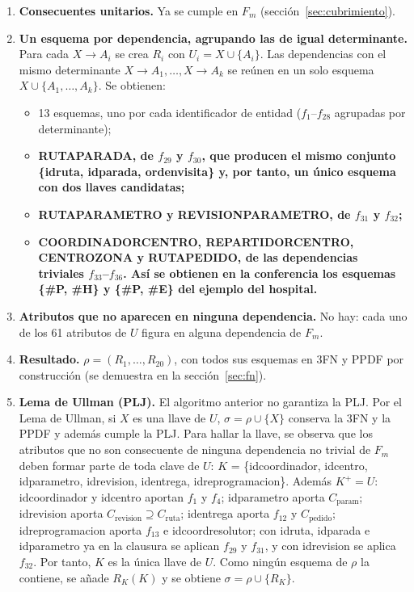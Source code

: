 \documentclass[11pt,a4paper]{article}
\newcommand{\ubrk}{\textunderscore\allowbreak}
\newcommand{\campo}[1]{\textnormal{\ttfamily\let\_\ubrk #1}}
\newcommand{\tabla}[1]{\begingroup\sffamily\bfseries\let\_\ubrk #1\endgroup}
\begin{document}
\begin{enumerate}
\item \textbf{Consecuentes unitarios.} Ya se cumple en $F_m$ (sección~\ref{sec:cubrimiento}).
\item \textbf{Un esquema por dependencia, agrupando las de igual determinante.} Para cada $X \rightarrow A_i$ se crea $R_i$ con $U_i = X \cup \{A_i\}$. Las dependencias con el mismo determinante $X \rightarrow A_1, \dots, X \rightarrow A_k$ se reúnen en un solo esquema $X \cup \{A_1, \dots, A_k\}$. Se obtienen:
  \begin{itemize}
  \item 13 esquemas, uno por cada identificador de entidad ($f_1$--$f_{28}$ agrupadas por determinante);
  \item \tabla{RUTA\_PARADA}, de $f_{29}$ y $f_{30}$, que producen el mismo conjunto \{\campo{id\_ruta}, \campo{id\_parada}, \campo{orden\_visita}\} y, por tanto, un único esquema con dos llaves candidatas;
  \item \tabla{RUTA\_PARAMETRO} y \tabla{REVISION\_PARAMETRO}, de $f_{31}$ y $f_{32}$;
  \item \tabla{COORDINADOR\_CENTRO}, \tabla{REPARTIDOR\_CENTRO}, \tabla{CENTRO\_ZONA} y \tabla{RUTA\_PEDIDO}, de las dependencias triviales $f_{33}$--$f_{36}$. Así se obtienen en la conferencia los esquemas \{\#P, \#H\} y \{\#P, \#E\} del ejemplo del hospital.
  \end{itemize}
\item \textbf{Atributos que no aparecen en ninguna dependencia.} No hay: cada uno de los 61 atributos de $U$ figura en alguna dependencia de $F_m$.
\item \textbf{Resultado.} $\rho = (R_1, \dots, R_{20})$, con todos sus esquemas en 3FN y PPDF por construcción (se demuestra en la sección~\ref{sec:fn}).
\item \textbf{Lema de Ullman (PLJ).} El algoritmo anterior no garantiza la PLJ. Por el Lema de Ullman, si $X$ es una llave de $U$, $\sigma = \rho \cup \{X\}$ conserva la 3FN y la PPDF y además cumple la PLJ. Para hallar la llave, se observa que los atributos que no son consecuente de ninguna dependencia no trivial de $F_m$ deben formar parte de toda clave de $U$: $K$ = \{\campo{id\_coordinador}, \campo{id\_centro}, \campo{id\_parametro}, \campo{id\_revision}, \campo{id\_entrega}, \campo{id\_reprogramacion}\}. Además $K^+ = U$: \campo{id\_coordinador} y \campo{id\_centro} aportan $f_1$ y $f_4$; \campo{id\_parametro} aporta $C_{\text{param}}$; \campo{id\_revision} aporta $C_{\text{revision}} \supseteq C_{\text{ruta}}$; \campo{id\_entrega} aporta $f_{12}$ y $C_{\text{pedido}}$; \campo{id\_reprogramacion} aporta $f_{13}$ e \campo{id\_coord\_resolutor}; con \campo{id\_ruta}, \campo{id\_parada} e \campo{id\_parametro} ya en la clausura se aplican $f_{29}$ y $f_{31}$, y con \campo{id\_revision} se aplica $f_{32}$. Por tanto, $K$ es la única llave de $U$. Como ningún esquema de $\rho$ la contiene, se añade $R_K(K)$ y se obtiene $\sigma = \rho \cup \{R_K\}$.
\end{enumerate}
\end{document}
